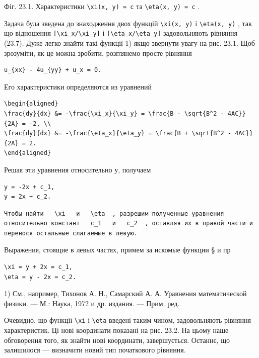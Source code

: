 \documentclass[
  ukrainian,
]{article}
\begin{document}
Фіг. 23.1. Характеристики \texttt{\textbackslash{}xi(x,\ y)\ =\ c} та
\texttt{\textbackslash{}eta(x,\ y)\ =\ c} .

Задача була зведена до знаходження двох функцій
\texttt{\textbackslash{}xi(x,\ y)} і \texttt{\textbackslash{}eta(x,\ y)}
, так що відношення
\texttt{{[}\textbackslash{}xi\_x/\textbackslash{}xi\_y{]}} і
\texttt{{[}\textbackslash{}eta\_x/\textbackslash{}eta\_y{]}}
задовольняють рівняння (23.7). Дуже легко знайти такі функції 1) якщо
звернути увагу на рис. 23.1. Щоб зрозуміти, як це можна зробити,
розглянемо просте рівняння

\begin{verbatim}
u_{xx} - 4u_{yy} + u_x = 0.
\end{verbatim}

Его характеристики определяются из уравнений

\begin{verbatim}
\begin{aligned}
\frac{dy}{dx} &= -\frac{\xi_x}{\xi_y} = \frac{B - \sqrt{B^2 - 4AC}}{2A} = -2, \\
\frac{dy}{dx} &= -\frac{\eta_x}{\eta_y} = \frac{B + \sqrt{B^2 - 4AC}}{2A} = 2.
\end{aligned}
\end{verbatim}

Решая эти уравнения относительно у, получаем

\begin{verbatim}
y = -2x + c_1,
y = 2x + c_2.
\end{verbatim}

\begin{verbatim}
Чтобы найти   \xi   и   \eta  , разрешим полученные уравнения относительно констант   c_1   и   c_2  , оставляя их в правой части и перенося остальные слагаемые в левую.
\end{verbatim}

Выражения, стоящие в левых частях, примем за искомые функции § и пр

\begin{verbatim}
\xi = y + 2x = c_1,
\eta = y - 2x = c_2.
\end{verbatim}

1) См., например, Тихонов А. Н., Самарский А. А. Уравнения
математической физики. --- М.: Наука, 1972 и др. издания. --- Прим. ред.

Очевидно, що функції \texttt{\textbackslash{}xi} і
\texttt{\textbackslash{}eta} введені таким чином, задовольняють рівняння
характеристик. Ці нові координати показані на рис. 23.2. На цьому наше
обговорення того, як знайти нові координати, завершується. Останнє, що
залишилося --- визначити новий тип початкового рівняння.
\end{document}
